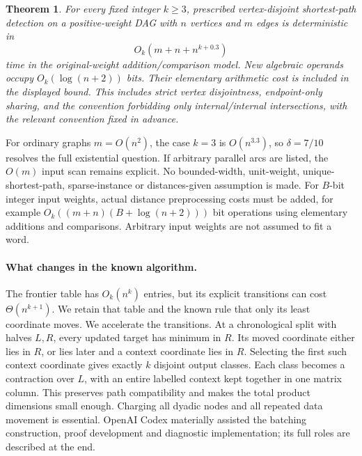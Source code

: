 \documentclass[acmlarge,11pt,screen,nonacm]{acmart}
\newtheorem{theorem}{Theorem}[section]
\begin{document}
\begin{theorem}\label{thm:main}
For every fixed integer $k\geq3$, prescribed vertex-disjoint shortest-path
detection on a positive-weight DAG with $n$ vertices and $m$ edges is
deterministic in
\[
 O_k(m+n+n^{k+0.3})
\]
time in the original-weight addition/comparison model. New algebraic operands
occupy $O_k(\log(n+2))$ bits. Their elementary arithmetic
cost is included in the displayed bound. This includes strict vertex
disjointness, endpoint-only sharing, and the convention forbidding only
internal/internal intersections, with the relevant convention fixed in advance.
\end{theorem}

For ordinary graphs $m=O(n^2)$, the case $k=3$ is $O(n^{3.3})$, so
$\delta=7/10$ resolves the full existential question. If arbitrary parallel
arcs are listed, the $O(m)$ input scan remains explicit. No bounded-width,
unit-weight, unique-shortest-path, sparse-instance or distances-given
assumption is made. For $B$-bit integer input weights, actual distance
preprocessing costs must be added, for example
$O_k((m+n)(B+\log(n+2)))$ bit operations using elementary additions and
comparisons. Arbitrary input weights are not assumed to fit a word.

\paragraph{What changes in the known algorithm.}
The frontier table has $O_k(n^k)$ entries, but its explicit transitions can
cost $\Theta(n^{k+1})$. We retain that table and the known rule that only its
least coordinate moves. We accelerate the transitions. At a chronological
split with halves $L,R$, every updated target has minimum in $R$. Its moved
coordinate either lies in $R$, or lies later and a context coordinate lies
in $R$. Selecting the first such context coordinate gives exactly $k$
disjoint output classes. Each class becomes a contraction over $L$, with
an entire labelled context kept together in one matrix column. This preserves
path compatibility and makes the total product dimensions small enough.
Charging all dyadic nodes and all repeated data movement is essential.
OpenAI Codex materially assisted the batching construction, proof development
and diagnostic implementation; its full roles are described at the end.
\end{document}
